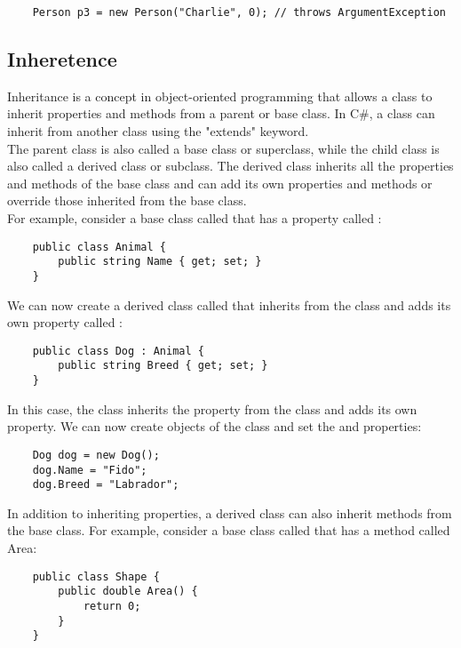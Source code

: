 \documentclass{report}
\begin{document}
\begin{verbatim}
    Person p3 = new Person("Charlie", 0); // throws ArgumentException
\end{verbatim}

\subsection{Inheretence}
Inheritance is a concept in object-oriented programming that allows a class to inherit properties and methods from a parent or base class. In C\#, a class can inherit from another class using the "extends" keyword.\\

The parent class is also called a base class or superclass, while the child class is also called a derived class or subclass. The derived class inherits all the properties and methods of the base class and can add its own properties and methods or override those inherited from the base class.\\

For example, consider a base class called  that has a property called :

\begin{verbatim}
    public class Animal {
        public string Name { get; set; }
    }
\end{verbatim}

We can now create a derived class called  that inherits from the  class and adds its own property called :
\begin{verbatim}
    public class Dog : Animal {
        public string Breed { get; set; }
    }
\end{verbatim}

In this case, the  class inherits the  property from the  class and adds its own  property. We can now create objects of the  class and set the  and  properties:
\begin{verbatim}
    Dog dog = new Dog();
    dog.Name = "Fido";
    dog.Breed = "Labrador";
\end{verbatim}

In addition to inheriting properties, a derived class can also inherit methods from the base class. For example, consider a base class called  that has a method called Area:
\begin{verbatim}
    public class Shape {
        public double Area() {
            return 0;
        }
    }
\end{verbatim}
\end{document}
